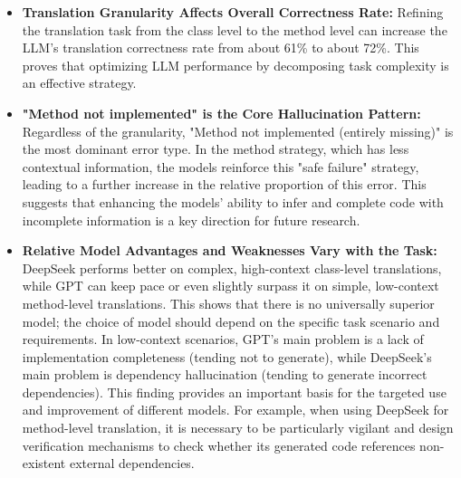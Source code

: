 \begin{itemize}[leftmargin=1.5em]
    \item \textbf{Translation Granularity Affects Overall Correctness Rate: }Refining the translation task from the class level to the method level can increase the LLM's translation correctness rate from about 61\% to about 72\%. This proves that optimizing LLM performance by decomposing task complexity is an effective strategy.
    \item \textbf{"Method not implemented" is the Core Hallucination Pattern: }Regardless of the granularity, "Method not implemented (entirely missing)" is the most dominant error type. In the method strategy, which has less contextual information, the models reinforce this "safe failure" strategy, leading to a further increase in the relative proportion of this error. This suggests that enhancing the models' ability to infer and complete code with incomplete information is a key direction for future research.
    \item \textbf{Relative Model Advantages and Weaknesses Vary with the Task: }DeepSeek performs better on complex, high-context class-level translations, while GPT can keep pace or even slightly surpass it on simple, low-context method-level translations. This shows that there is no universally superior model; the choice of model should depend on the specific task scenario and requirements. In low-context scenarios, GPT's main problem is a lack of implementation completeness (tending not to generate), while DeepSeek's main problem is dependency hallucination (tending to generate incorrect dependencies). This finding provides an important basis for the targeted use and improvement of different models. For example, when using DeepSeek for method-level translation, it is necessary to be particularly vigilant and design verification mechanisms to check whether its generated code references non-existent external dependencies.
\end{itemize}
